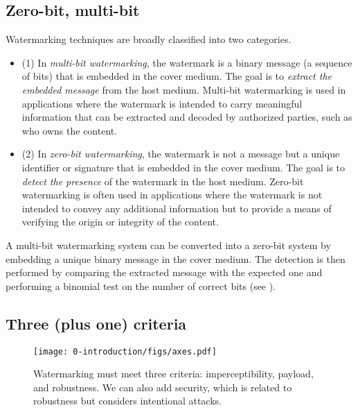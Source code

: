 \subsection{Zero-bit, multi-bit}

Watermarking techniques are broadly classified into two categories.
\begin{itemize}
    \item 
    (1) In \emph{\gls*{multi-bit watermarking}},
        the watermark is a binary message (a sequence of bits) that is embedded in the cover medium.
        The goal is to \emph{extract the embedded message} from the host medium.
        Multi-bit watermarking is used in applications where the watermark is intended to carry meaningful information that can be extracted and decoded by authorized parties, such as who owns the content.
    \item
    (2) In \emph{\gls*{zero-bit watermarking}}, 
        the watermark is not a message but a unique identifier or signature that is embedded in the cover medium. 
        The goal is to \emph{detect the presence} of the watermark in the host medium.
        Zero-bit watermarking is often used in applications where the watermark is not intended to convey any additional information but to provide a means of verifying the origin or integrity of the content.
\end{itemize}

A multi-bit watermarking system can be converted into a zero-bit system by embedding a unique binary message in the cover medium. 
The detection is then performed by comparing the extracted message with the expected one and performing a binomial test on the number of correct bits (see \hyperref[chap0/sec:test]{}).



\subsection{Three (plus one) criteria}

\begin{figure}[b]
    \centering
    \texttt{[image: 0-introduction/figs/axes.pdf]}
    \caption{
        Watermarking must meet three criteria: imperceptibility, payload, and robustness.
        We can also add security, which is related to robustness but considers intentional attacks.
    }
    \label{intro/fig:criteria}
\end{figure}

